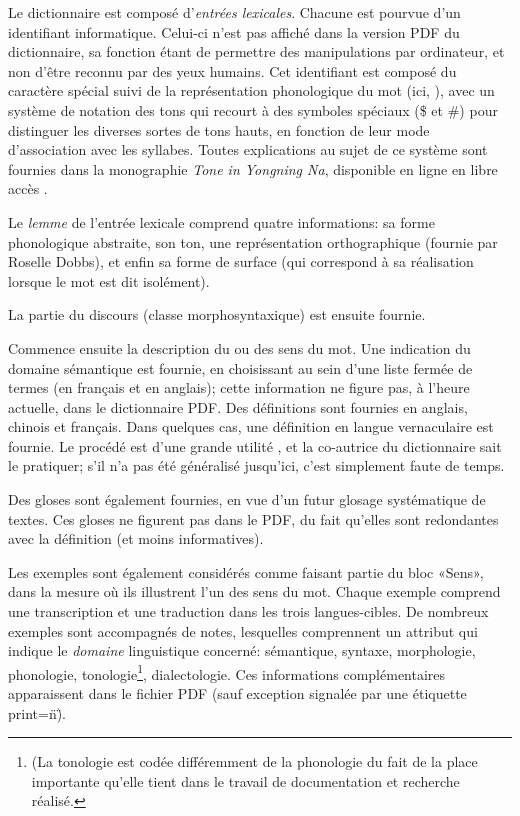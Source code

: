 Le dictionnaire est composé d'\emph{entrées lexicales}. Chacune est pourvue d'un identifiant informatique. Celui-ci n'est pas affiché dans la version PDF du dictionnaire, sa fonction étant de permettre des manipulations par ordinateur, et non d'être reconnu par des yeux humains. Cet identifiant est composé du caractère spécial  suivi de la représentation phonologique du mot (ici, ), avec un système de notation des tons qui recourt à des symboles spéciaux (\$ et \#) pour distinguer les diverses sortes de tons hauts, en fonction de leur mode d’association avec les syllabes. Toutes explications au sujet de ce système sont fournies dans la monographie \emph{Tone in Yongning Na}, disponible en ligne en libre accès \parencite[80-90]{michaud2017}.

Le \emph{lemme} de l'entrée lexicale comprend quatre informations: sa forme phonologique abstraite, son ton, une représentation orthographique (fournie par Roselle Dobbs), et enfin sa forme de surface (qui correspond à sa réalisation lorsque le mot est dit isolément).

La partie du discours (classe morphosyntaxique) est ensuite fournie.

Commence ensuite la description du ou des sens du mot. Une indication du domaine sémantique est fournie, en choisissant au sein d'une liste fermée de termes (en français et en anglais); cette information ne figure pas, à l'heure actuelle, dans le dictionnaire PDF. Des définitions sont fournies en anglais, chinois et français. Dans quelques cas, une définition en langue vernaculaire est fournie. Le procédé est d'une grande utilité \parencite{dingemanse_folk_2015}, et la co-autrice du dictionnaire sait le pratiquer; s'il n'a pas été généralisé jusqu'ici, c'est simplement faute de temps.

Des gloses sont également fournies, en vue d'un futur glosage systématique de textes. Ces gloses ne figurent pas dans le PDF, du fait qu'elles sont redondantes avec la définition (et moins informatives).

Les exemples sont également considérés comme faisant partie du bloc «Sens», dans la mesure où ils illustrent l'un des sens du mot. Chaque exemple comprend une transcription et une traduction dans les trois langues-cibles. De nombreux exemples sont accompagnés de notes, lesquelles comprennent un attribut qui indique le \emph{domaine} linguistique concerné: sémantique, syntaxe, morphologie, phonologie, tonologie\footnote{(La tonologie est codée différemment de la phonologie du fait de la place importante qu'elle tient dans le travail de documentation et recherche réalisé.}, dialectologie. Ces informations complémentaires apparaissent dans le fichier PDF (sauf exception signalée par une étiquette print=\"n\").


